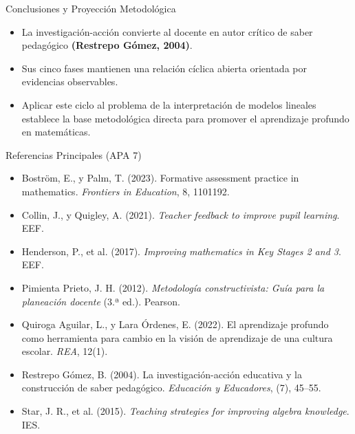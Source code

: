 \documentclass[aspectratio=169,spanish,xcolor=table]{beamer}
\begin{document}
\begin{frame}{Conclusiones y Proyección Metodológica}
  \begin{itemize}\normalsize
    \item La investigación-acción convierte al docente en autor crítico de saber pedagógico \textbf{(Restrepo Gómez, 2004)}.
    \item Sus cinco fases mantienen una relación cíclica abierta orientada por evidencias observables.
    \item Aplicar este ciclo al problema de la interpretación de modelos lineales establece la base metodológica directa para promover el aprendizaje profundo en matemáticas.
  \end{itemize}
\end{frame}

\begin{frame}{Referencias Principales (APA 7)}
  \scriptsize\setlength{\parskip}{5pt}
  \begin{itemize}
    \item Boström, E., y Palm, T. (2023). Formative assessment practice in mathematics. \textit{Frontiers in Education}, 8, 1101192.
    \item Collin, J., y Quigley, A. (2021). \textit{Teacher feedback to improve pupil learning}. EEF.
    \item Henderson, P., et al. (2017). \textit{Improving mathematics in Key Stages 2 and 3}. EEF.
    \item Pimienta Prieto, J. H. (2012). \textit{Metodología constructivista: Guía para la planeación docente} (3.ª ed.). Pearson.
    \item Quiroga Aguilar, L., y Lara Órdenes, E. (2022). El aprendizaje profundo como herramienta para cambio en la visión de aprendizaje de una cultura escolar. \textit{REA}, 12(1).
    \item Restrepo Gómez, B. (2004). La investigación-acción educativa y la construcción de saber pedagógico. \textit{Educación y Educadores}, (7), 45--55.
    \item Star, J. R., et al. (2015). \textit{Teaching strategies for improving algebra knowledge}. IES.
  \end{itemize}
\end{frame}
\end{document}
